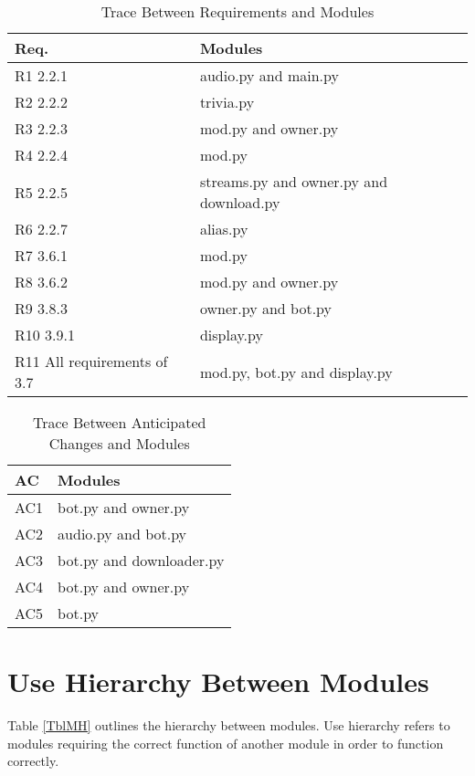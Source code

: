 \documentclass[12pt, titlepage]{article}
\begin{document}
\begin{table}[H]
\centering
\begin{tabular}{p{} p{}}
\toprule
\textbf{Req.} & \textbf{Modules}\\
\midrule
R1 2.2.1  & audio.py and main.py\\
R2 2.2.2 & trivia.py\\
R3 2.2.3 & mod.py and owner.py\\
R4 2.2.4 & mod.py\\
R5 2.2.5 & streams.py and owner.py and download.py\\
R6 2.2.7 & alias.py\\
R7 3.6.1 & mod.py\\
R8  3.6.2 & mod.py and owner.py\\
R9 3.8.3 & owner.py and bot.py\\
R10 3.9.1 & display.py\\
R11 All requirements of 3.7 & mod.py, bot.py and display.py\\
\bottomrule
\end{tabular}
\caption{Trace Between Requirements and Modules}
\label{TblRT}
\end{table}

\begin{table}[H]
\centering
\begin{tabular}{p{} p{}}
\toprule
\textbf{AC} & \textbf{Modules}\\
\midrule
 AC1 & bot.py and owner.py \\
 AC2 & audio.py and bot.py \\
 AC3 & bot.py and downloader.py \\
 AC4 & bot.py and owner.py \\
 AC5 & bot.py \\
\bottomrule
\end{tabular}
\caption{Trace Between Anticipated Changes and Modules}
\label{TblACT}
\end{table}

\section{Use Hierarchy Between Modules} \label{SecUse}

 Table \ref{TblMH} outlines the hierarchy between modules.  Use hierarchy refers to modules requiring the correct function of another module in order to function correctly. 
\end{document}
